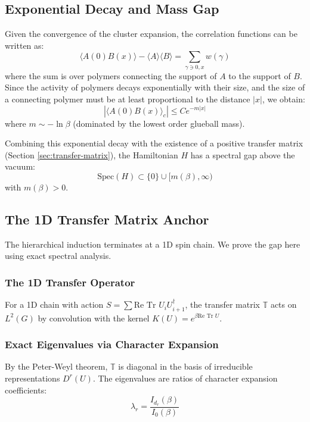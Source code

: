 \subsection{Exponential Decay and Mass Gap}

Given the convergence of the cluster expansion, the correlation functions can be written as:
\[
\langle A(0) B(x) \rangle - \langle A \rangle \langle B \rangle = \sum_{\gamma \ni 0, x} w(\gamma)
\]
where the sum is over polymers connecting the support of $A$ to the support of $B$.
Since the activity of polymers decays exponentially with their size, and the size of a connecting polymer must be at least proportional to the distance $|x|$, we obtain:
\[
|\langle A(0) B(x) \rangle_c| \le C e^{-m |x|}
\]
where $m \sim -\ln \beta$ (dominated by the lowest order glueball mass).

\begin{corollary}
Combining this exponential decay with the existence of a positive transfer matrix (Section \ref{sec:transfer-matrix}), the Hamiltonian $H$ has a spectral gap above the vacuum:
\[
\text{Spec}(H) \subset \{0\} \cup [m(\beta), \infty)
\]
with $m(\beta) > 0$.
\end{corollary}

\subsection{The 1D Transfer Matrix Anchor}
\label{sec:1d_anchor}

The hierarchical induction terminates at a 1D spin chain. We prove the gap here using exact spectral analysis.

\subsubsection{The 1D Transfer Operator}
For a 1D chain with action $S = \sum \text{Re Tr } U_i U_{i+1}^\dagger$, the transfer matrix $\mathbb{T}$ acts on $L^2(G)$ by convolution with the kernel $K(U) = e^{\beta \text{Re Tr } U}$.

\subsubsection{Exact Eigenvalues via Character Expansion}
By the Peter-Weyl theorem, $\mathbb{T}$ is diagonal in the basis of irreducible representations $D^r(U)$. The eigenvalues are ratios of character expansion coefficients:
\begin{equation}
\lambda_r = \frac{I_{d_r}(\beta)}{I_0(\beta)}
\end{equation}

